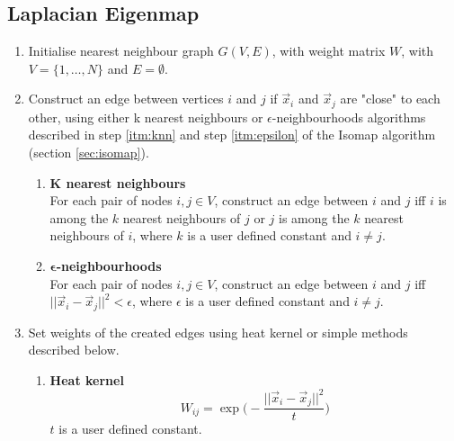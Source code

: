 \documentclass[a4paper, 11pt]{article}
\begin{document}
\subsection{Laplacian Eigenmap} \label{sec:eigenmap}
\begin{enumerate}
	\item Initialise nearest neighbour graph $G(V,E)$, with weight matrix $W$, with $V = \{1, \dots , N\}$ and $E = \emptyset$. 

	\item Construct an edge between vertices $i$ and $j$ if $\vec{x}_i$ and $\vec{x}_j$ are "close" to each other, using either k nearest neighbours or $\epsilon$-neighbourhoods algorithms described in step \ref{itm:knn}  and step \ref{itm:epsilon} 	of the Isomap algorithm (section \ref{sec:isomap}).
	
	\begin{multicols}{2}
	\begin{enumerate}
	\item \label{itm:knn} \textbf{K nearest neighbours} \\
	For each pair of nodes $i,j \in V$,  construct an 		edge between $i$ and $j$ iff $i$ is among the $k$ nearest 		neighbours of $j$ or $j$ is among the $k$ nearest 				neighbours of $i$, where $k$ is a user defined constant and $i \neq j$.  

	\columnbreak
	\item \label{itm:epsilon} \textbf{$\boldsymbol{\epsilon}$-neighbourhoods} \\
	For each pair of nodes $i,j \in V$,  construct an 		edge between $i$ and $j$ iff $||\vec{x}_i - \vec{x}_j||^2 < 	\epsilon$, where $\epsilon$ is a user defined constant and $i \neq j$.  

	\end{enumerate}
	\end{multicols}

	\item Set weights of the created edges using heat kernel or 	simple methods described below.

	\begin{multicols}{2}
	\begin{enumerate}
	\item \textbf{Heat kernel} \label{itm:heatkernel}
	\begin{equation}
	W_{ij} = \exp{\Big(-\frac{||\vec{x}_i - \vec{x}_j||^2}{t}		\Big)}
	\end{equation}	  
	$t$ is a user defined constant.


\end{enumerate}
\end{multicols}
\end{enumerate}
\end{document}

